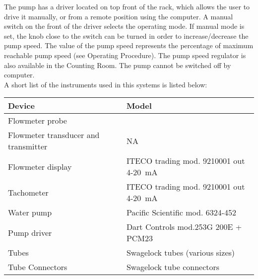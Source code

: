 {The pump has a driver located on top front of the rack, which allows
the user to drive it manually, or from a remote position using the
computer. A manual switch on the front of the driver selects the operating
mode. If manual mode is set, the knob close to the switch can be turned
in order to increase/decrease the pump speed. The value of the pump
speed represents the percentage of maximum reachable pump speed (see
Operating Procedure). The pump speed regulator is also available in
the Counting Room. The pump cannot be switched off by computer. \\


A short list of the instruments used in this systems is listed below: 

\begin{center}\begin{tabular}{ll}
\hline 
Device &
 Model \\
\hline
Flowmeter probe &
 \\
 Flowmeter transducer and transmitter &
 NA\\
 Flowmeter display &
 ITECO trading mod. 9210001 out 4-20~mA \\
 Tachometer &
 ITECO trading mod. 9210001 out 4-20~mA \\
 Water pump &
 Pacific Scientific mod. 6324-452 \\
 Pump driver &
 Dart Controls mod.253G 200E + PCM23 \\
 Tubes &
 Swagelock tubes (various sizes) \\
 Tube Connectors &
 Swagelock tube connectors  \\
\hline
\end{tabular}\end{center}

} %

